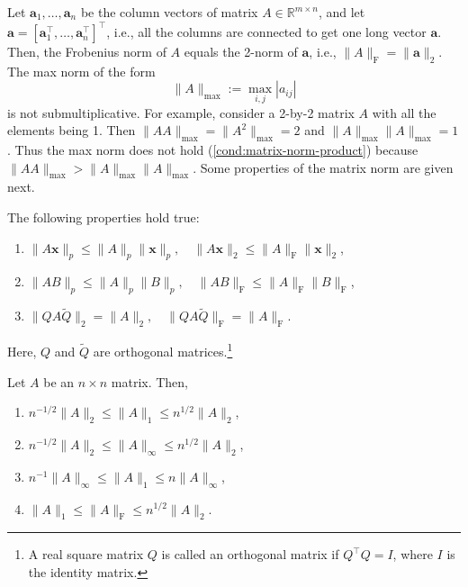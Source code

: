 {Let $\bm a_1,\ldots,\bm a_n$ be the column vectors of matrix $A\in\mathbb R^{m\times n}$, and let $\bm a=[\bm a_1^\top,\ldots,\bm a_n^\top]^\top$, i.e., all the columns are connected to get one long vector $\bm a$. Then, the Frobenius norm of $A$ equals the 2-norm of $\bm a$, i.e., $\|A\|_{\mathrm F}=\|\bm a\|_2$.}
{The max norm of the form}
\[
\|A\|_{\max}:=\max_{i,j}|a_{ij}|
\]
{is not submultiplicative. For example, consider a 2-by-2 matrix $A$ with all the elements being 1. Then $\|AA\|_{\max}=\|A^2\|_{\max}=2$ and $\|A\|_{\max}\|A\|_{\max}=1$. Thus the max norm does not hold (\ref{cond:matrix-norm-product}) because $\|AA\|_{\max}>\|A\|_{\max}\|A\|_{\max}$.}
{Some properties of the matrix norm are given next.}
\begin{Theorem}\label{thm:matrix-norm-properties}
{The following properties hold true:}
\begin{enumerate}[label=(\arabic*),ref=\arabic*]
\item\label{part:matrix-norm-action} $\|A\bm x\|_p\le\|A\|_p\|\bm x\|_p,\quad\|A\bm x\|_2\le\|A\|_{\mathrm F}\|\bm x\|_2$,
\item $\|AB\|_p\le\|A\|_p\|B\|_p,\quad\|AB\|_{\mathrm F}\le\|A\|_{\mathrm F}\|B\|_{\mathrm F}$,
\item $\|QA\tilde Q\|_2=\|A\|_2,\quad\|QA\tilde Q\|_{\mathrm F}=\|A\|_{\mathrm F}$.
\end{enumerate}
{Here, $Q$ and $\tilde Q$ are orthogonal matrices.\footnote{A real square matrix $Q$ is called an orthogonal matrix if $Q^\top Q=I$, where $I$ is the identity matrix.}}
\end{Theorem}
\begin{Theorem}\label{thm:matrix-norm-comparisons}
{Let $A$ be an $n\times n$ matrix. Then,}
\begin{enumerate}[label=(\arabic*)]
\item $n^{-1/2}\|A\|_2\le\|A\|_1\le n^{1/2}\|A\|_2$,
\item $n^{-1/2}\|A\|_2\le\|A\|_\infty\le n^{1/2}\|A\|_2$,
\item $n^{-1}\|A\|_\infty\le\|A\|_1\le n\|A\|_\infty$,
\item $\|A\|_1\le\|A\|_{\mathrm F}\le n^{1/2}\|A\|_2$.
\end{enumerate}
\end{Theorem}
